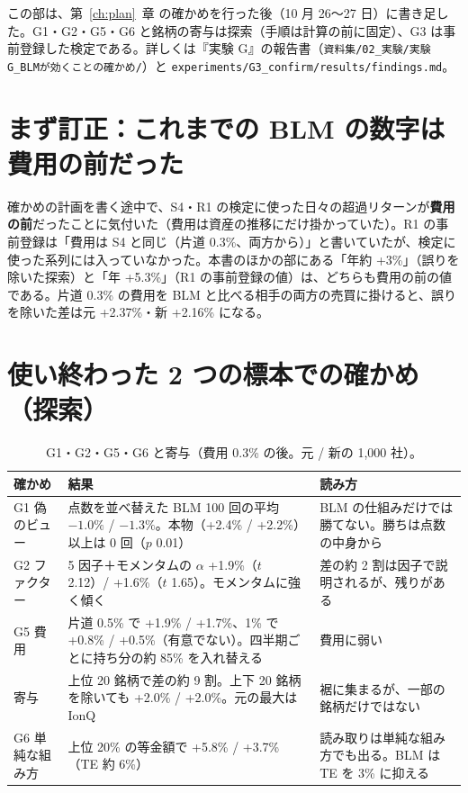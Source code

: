 \documentclass[xelatex,ja=standard,jafont=haranoaji,a4paper,10pt]{bxjsreport}
\newcommand{\code}[1]{\texttt{#1}}
\newcommand{\chapref}[1]{第~\ref{#1}~章}
\begin{document}
\begin{notebox}[2026 年 10 月 27 日の追記]
この部は、\chapref{ch:plan} の確かめを行った後（10 月 26〜27 日）に書き足した。G1・G2・G5・G6 と銘柄の寄与は探索（手順は計算の前に固定）、G3 は事前登録した検定である。詳しくは『実験 G』の報告書（\code{資料集/02\_実験/実験G\_BLMが効くことの確かめ/}）と \code{experiments/G3\_confirm/results/findings.md}。
\end{notebox}

\section{まず訂正：これまでの BLM の数字は費用の前だった}

確かめの計画を書く途中で、S4・R1 の検定に使った日々の超過リターンが\textbf{費用の前}だったことに気付いた（費用は資産の推移にだけ掛かっていた）。R1 の事前登録は「費用は S4 と同じ（片道 0.3\%、両方から）」と書いていたが、検定に使った系列には入っていなかった。本書のほかの部にある「年約 +3\%」（誤りを除いた探索）と「年 +5.3\%」（R1 の事前登録の値）は、どちらも費用の前の値である。片道 0.3\% の費用を BLM と比べる相手の両方の売買に掛けると、誤りを除いた差は元 +2.37\%・新 +2.16\% になる。

\section{使い終わった 2 つの標本での確かめ（探索）}

\begin{longtable}{p{3.0cm}p{5.6cm}p{5.6cm}}
\caption{G1・G2・G5・G6 と寄与（費用 0.3\% の後。元 / 新の 1,000 社）。}\label{tab:proof-explore}\\
\toprule
\textbf{確かめ} & \textbf{結果} & \textbf{読み方} \\
\midrule
\endfirsthead
\bottomrule
\endfoot
G1 偽のビュー & 点数を並べ替えた BLM 100 回の平均 $-1.0\%$ / $-1.3\%$。本物（+2.4\% / +2.2\%）以上は 0 回（$p$ 0.01） & BLM の仕組みだけでは勝てない。勝ちは点数の中身から \\
G2 ファクター & 5 因子＋モメンタムの $\alpha$ +1.9\%（$t$ 2.12）/ +1.6\%（$t$ 1.65）。モメンタムに強く傾く & 差の約 2 割は因子で説明されるが、残りがある \\
G5 費用 & 片道 0.5\% で +1.9\% / +1.7\%、1\% で +0.8\% / +0.5\%（有意でない）。四半期ごとに持ち分の約 85\% を入れ替える & 費用に弱い \\
寄与 & 上位 20 銘柄で差の約 9 割。上下 20 銘柄を除いても +2.0\% / +2.0\%。元の最大は IonQ & 裾に集まるが、一部の銘柄だけではない \\
G6 単純な組み方 & 上位 20\% の等金額で +5.8\% / +3.7\%（TE 約 6\%） & 読み取りは単純な組み方でも出る。BLM は TE を 3\% に抑える \\
\end{longtable}
\end{document}
